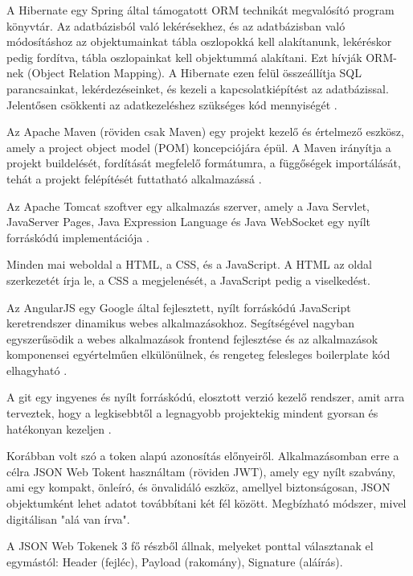 A Hibernate egy Spring által támogatott ORM technikát megvalósító program könyvtár. Az adatbázisból való lekérésekhez, és az adatbázisban való módosításhoz az objektumainkat tábla oszlopokká kell alakítanunk, lekéréskor pedig fordítva, tábla oszlopainkat kell objektummá alakítani. Ezt hívják ORM-nek (Object Relation Mapping). A Hibernate ezen felül összeállítja SQL parancsainkat, lekérdezéseinket, és kezeli a kapcsolatkiépítést az adatbázissal. Jelentősen csökkenti az adatkezeléshez szükséges kód mennyiségét \cite{spring}.

Az Apache Maven (röviden csak Maven) egy projekt kezelő és értelmező eszkösz, amely a project object model (POM) koncepciójára épül. A Maven irányítja a projekt buildelését, fordítását megfelelő formátumra, a függőségek importálását, tehát a projekt felépítését futtatható alkalmazássá \cite{maven}.

Az Apache Tomcat szoftver egy alkalmazás szerver, amely a Java Servlet, JavaServer Pages, Java Expression Language és Java WebSocket egy nyílt forráskódú implementációja \cite{tomcat}.

Minden mai weboldal a HTML, a CSS, és a JavaScript. A HTML az oldal szerkezetét írja le, a CSS a megjelenését, a JavaScript pedig a viselkedést.

Az AngularJS egy Google által fejlesztett, nyílt forráskódú JavaScript keretrendszer dinamikus webes alkalmazásokhoz. Segítségével nagyban egyszerűsödik a webes alkalmazások frontend fejlesztése és az alkalmazások komponensei egyértelműen elkülönülnek, és rengeteg felesleges boilerplate kód elhagyható \cite{angularjs}.

A git egy ingyenes és nyílt forráskódú, elosztott verzió kezelő rendszer, amit arra terveztek, hogy a legkisebbtől a legnagyobb projektekig mindent gyorsan és hatékonyan kezeljen \cite{git}.


Korábban volt szó a token alapú azonosítás előnyeiről. Alkalmazásomban erre a célra JSON Web Tokent használtam (röviden JWT), amely egy nyílt szabvány, ami egy kompakt, önleíró, és önvalidáló eszköz, amellyel biztonságosan, JSON objektumként lehet adatot továbbítani két fél között. Megbízható módszer, mivel digitálisan "alá van írva".

A JSON Web Tokenek 3 fő részből állnak, melyeket ponttal választanak el egymástól: Header (fejléc), Payload (rakomány), Signature (aláírás).

